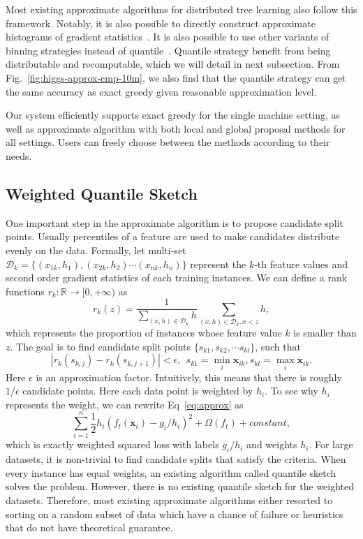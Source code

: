 \documentclass{sig-alternate-05-2015}
\newcommand{\x}{\mathbf{x}}
\newcommand{\eps}{\epsilon}
\newcommand{\Rplus}{[0, +\infty)}
\newcommand{\sD}{\mathcal{D}}
\begin{document}
Most existing approximate algorithms for distributed tree learning also follow this framework.
Notably, it is also possible to directly construct approximate histograms of gradient statistics~\cite{tyree2011parallel}.
It is also possible to use other variants of binning strategies instead of quantile~\cite{McRank}.
Quantile strategy benefit from being distributable and recomputable, which we will detail in next subsection.
From Fig.~\ref{fig:higgs-approx-cmp-10m}, we also find that the quantile strategy can get the same accuracy as exact greedy given reasonable approximation level.

Our system efficiently supports exact greedy for the single machine setting, as well as approximate algorithm with both local and global proposal methods for all settings.
Users can freely choose between the methods according to their needs.


\subsection{Weighted Quantile Sketch}\label{sec:quantile}
One important step in the approximate algorithm is to propose candidate split points. Usually percentiles of a feature are used to make candidates distribute evenly on the data.
Formally, let multi-set
$\sD_k=\{(x_{1k}, h_1), (x_{2k}, h_2) \cdots (x_{nk}, h_n)\}$
represent the $k$-th feature values and second order gradient statistics of each training instances.
We can define a rank functions $r_{k} : \mathbb{R} \rightarrow \Rplus$ as
\begin{equation}
    r_{k}(z) =\frac{1}{\sum_{(x, h)\in \sD_k} h} \sum_{(x, h)\in \sD_k, x < z} h,
\end{equation}
which represents the proportion of instances whose feature value $k$ is smaller than $z$.
The goal is to find candidate split points $\{s_{k1}, s_{k2}, \cdots s_{kl}\}$, such that
\begin{equation}
    |r_{k}(s_{k,j})  - r_{k}(s_{k,j+1})| < \eps, \ \ s_{k1} = \min_i \x_{ik},  s_{kl} = \max_i \x_{ik}.
\end{equation} \label{eq:quantile}
Here $\eps$ is an approximation factor.
Intuitively, this means that there is roughly $1 / \eps$ candidate points.
Here each data point is weighted by $h_i$.
To see why $h_i$ represents the weight, we can rewrite  Eq~\eqref{eq:approx} as
$$
\sum_{i=1}^n \frac{1}{2} h_i (f_t(\x_i) - g_i / h_i )^2 + \Omega(f_t) + constant,
$$
which is exactly weighted squared loss with labels $g_i/h_i$ and weights $h_i$.
For large datasets, it is non-trivial to find candidate splits that satisfy the criteria.
When every instance has equal  weights, an existing algorithm called quantile sketch~\cite{Greenwald:SIGMOID01,Zhang:SSDBM}
solves the problem. However, there is no existing quantile sketch for the weighted datasets.
Therefore, most existing approximate algorithms either resorted to sorting on a random subset of data which have a chance of failure or heuristics that do not have theoretical guarantee.
\end{document}
